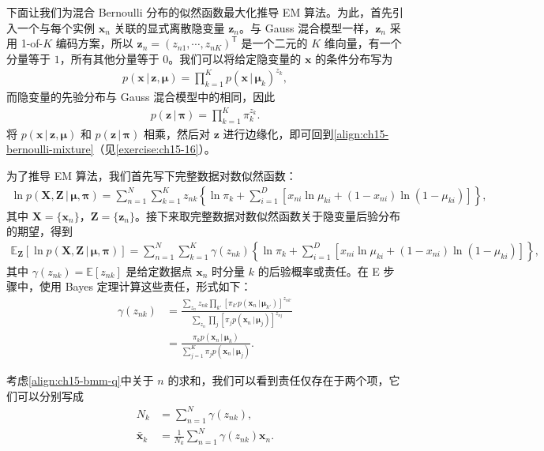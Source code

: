 \documentclass[../../main.tex]{subfiles}
\begin{document}
下面让我们为混合 Bernoulli 分布的似然函数最大化推导 EM 算法。为此，首先引入一个与每个实例 $\bm{x}_n$ 关联的显式离散隐变量 $\bm{z}_n$。与 Gauss 混合模型一样，$\bm{z}_n$ 采用 1-of-$K$ 编码方案，所以 $\bm{z}_n=(z_{n1},\cdots,z_{nK})^{\mathsf T}$ 是一个二元的 $K$ 维向量，有一个分量等于 $1$，所有其他分量等于 $0$。我们可以将给定隐变量的 $\bm{x}$ 的条件分布写为
\begin{align}
p(\bm{x}\,|\,\bm{z},\bm{\mu})=\prod_{k=1}^{K}p(\bm{x}\,|\,\bm{\mu}_k)^{z_k},
\label{align:ch15-bmm-conditional}
\end{align}
而隐变量的先验分布与 Gauss 混合模型中的相同，因此
\begin{align}
p(\bm{z}\,|\,\bm{\pi})=\prod_{k=1}^{K}\pi_k^{z_k}.
\label{align:ch15-bmm-prior}
\end{align}
将 $p(\bm{x}\,|\,\bm{z},\bm{\mu})$ 和 $p(\bm{z}\,|\,\bm{\pi})$ 相乘，然后对 $\bm{z}$ 进行边缘化，即可回到\eqref{align:ch15-bernoulli-mixture}（见\cref{exercise:ch15-16}）。

为了推导 EM 算法，我们首先写下完整数据对数似然函数：
\begin{align}
\ln p(\bm{X},\bm{Z}\,|\,\bm{\mu},\bm{\pi})=\sum_{n=1}^{N}\sum_{k=1}^{K}z_{nk}\!\left\{\ln\pi_k+\sum_{i=1}^{D}\left[x_{ni}\ln\mu_{ki}+(1-x_{ni})\ln(1-\mu_{ki})\right]\right\},
\label{align:ch15-bmm-complete-nll}
\end{align}
其中 $\bm{X}=\{\bm{x}_n\}$，$\bm{Z}=\{\bm{z}_n\}$。接下来取完整数据对数似然函数关于隐变量后验分布的期望，得到
\begin{align}
\mathbb{E}_{\bm{Z}}\!\left[\ln p(\bm{X},\bm{Z}\,|\,\bm{\mu},\bm{\pi})\right]=\sum_{n=1}^{N}\sum_{k=1}^{K}\gamma(z_{nk})\!\left\{\ln\pi_k+\sum_{i=1}^{D}\left[x_{ni}\ln\mu_{ki}+(1-x_{ni})\ln(1-\mu_{ki})\right]\right\},
\label{align:ch15-bmm-q}
\end{align}
其中 $\gamma(z_{nk})=\mathbb{E}[z_{nk}]$ 是给定数据点 $\bm{x}_n$ 时分量 $k$ 的后验概率或责任。在 E 步骤中，使用 Bayes 定理计算这些责任，形式如下：
\begin{align}
\gamma(z_{nk})
&=\frac{\sum_{z_n}z_{nk}\prod_{k'}\left[\pi_{k'}p(\bm{x}_n\,|\,\bm{\mu}_{k'})\right]^{z_{nk'}}}{\sum_{z_n}\prod_{j}\left[\pi_j p(\bm{x}_n\,|\,\bm{\mu}_j)\right]^{z_{nj}}}\nonumber\\
&=\frac{\pi_k p(\bm{x}_n\,|\,\bm{\mu}_k)}{\sum_{j=1}^{K}\pi_j p(\bm{x}_n\,|\,\bm{\mu}_j)}.
\label{align:ch15-bmm-responsibility}
\end{align}

考虑\eqref{align:ch15-bmm-q}中关于 $n$ 的求和，我们可以看到责任仅存在于两个项，它们可以分别写成
\begin{align}
N_k&=\sum_{n=1}^{N}\gamma(z_{nk}),
\label{align:ch15-bmm-nk}\\
\bar{\bm{x}}_k&=\frac{1}{N_k}\sum_{n=1}^{N}\gamma(z_{nk})\bm{x}_n.
\label{align:ch15-bmm-xbar}
\end{align}
\end{document}
